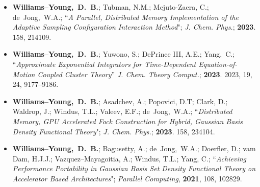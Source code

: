 \documentclass[10pt]{res} %
\newcommand*\me[0]{{\bf Williams--Young,~D.~B.}}
\newcommand*\xsli[0]{Li,~X.}
\newcommand*\cy[0]{Yang,~C.}
\newcommand*\bdj[0]{de~Jong,~W.A.}
\begin{document}
\begin{resume}
\begin{itemize}[leftmargin=*]
  \item \me; Tubman, N.M.; Mejuto-Zaera, C.; \bdj;
        ``\emph{A Parallel, Distributed Memory Implementation of the Adaptive 
                Sampling Configuration Interaction Method}";
        \emph{J. Chem. Phys.}; \textbf{2023}. 158, 214109. 
  \item \me; Yuwono, S.; DePrince III, A.E.; \cy; 
        ``\emph{Approximate Exponential Integrators for Time-Dependent Equation-of-Motion Coupled Cluster Theory}”
	\emph{J. Chem. Theory Comput.}; \textbf{2023}. 2023, 19, 24, 9177–9186.
  \item \me; Asadchev, A.; Popovici, D.T; Clark, D.; Waldrop, J.; Windus, T.L.;
        Valeev, E.F.; \bdj;
        ``\emph{Distributed Memory, GPU Accelerated Fock Construction for Hybrid, Gaussian 
                Basis Density Functional Theory}";
        \emph{J. Chem. Phys.}; \textbf{2023}. 158, 234104.
  \item \me; Bagusetty, A.; \bdj; Doerfler, D.; vam Dam, H.J.J.; Vazquez--Mayagoitia, A.;
        Windus, T.L.; Yang, C.;
        ``\emph{Achieving Performance Portability in Gaussian Basis Set Density Functional Theory 
                on Accelerator Based Architectures}"; \emph{Parallel Computing},
        \textbf{2021}, 108, 102829.
\end{itemize}



\end{resume}
\end{document}
